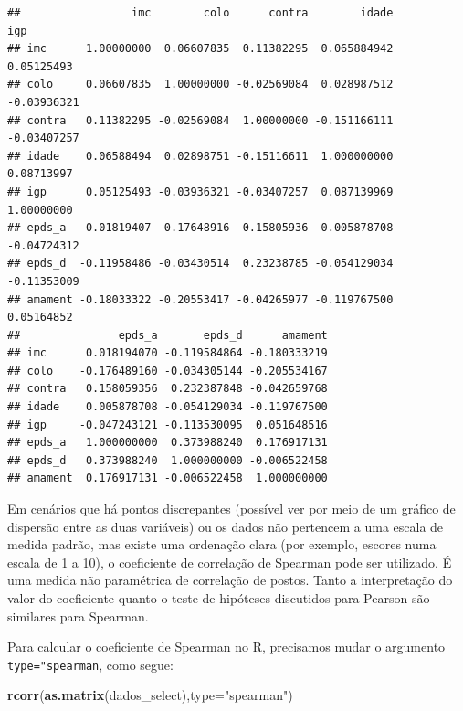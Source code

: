 \documentclass[
]{book}
\newenvironment{Shaded}{\begin{snugshade}}{\end{snugshade}}
\newcommand{\DataTypeTok}[1]{\textcolor[rgb]{0.13,0.29,0.53}{#1}}
\newcommand{\KeywordTok}[1]{\textcolor[rgb]{0.13,0.29,0.53}{\textbf{#1}}}
\newcommand{\NormalTok}[1]{#1}
\newcommand{\StringTok}[1]{\textcolor[rgb]{0.31,0.60,0.02}{#1}}
\begin{document}
\begin{verbatim}
##                 imc        colo      contra        idade         igp
## imc      1.00000000  0.06607835  0.11382295  0.065884942  0.05125493
## colo     0.06607835  1.00000000 -0.02569084  0.028987512 -0.03936321
## contra   0.11382295 -0.02569084  1.00000000 -0.151166111 -0.03407257
## idade    0.06588494  0.02898751 -0.15116611  1.000000000  0.08713997
## igp      0.05125493 -0.03936321 -0.03407257  0.087139969  1.00000000
## epds_a   0.01819407 -0.17648916  0.15805936  0.005878708 -0.04724312
## epds_d  -0.11958486 -0.03430514  0.23238785 -0.054129034 -0.11353009
## amament -0.18033322 -0.20553417 -0.04265977 -0.119767500  0.05164852
##               epds_a       epds_d      amament
## imc      0.018194070 -0.119584864 -0.180333219
## colo    -0.176489160 -0.034305144 -0.205534167
## contra   0.158059356  0.232387848 -0.042659768
## idade    0.005878708 -0.054129034 -0.119767500
## igp     -0.047243121 -0.113530095  0.051648516
## epds_a   1.000000000  0.373988240  0.176917131
## epds_d   0.373988240  1.000000000 -0.006522458
## amament  0.176917131 -0.006522458  1.000000000
\end{verbatim}

Em cenários que há pontos discrepantes (possível ver por meio de um gráfico de dispersão entre as duas variáveis) ou os dados não pertencem a uma escala de medida padrão, mas existe uma ordenação clara (por exemplo, escores numa escala de 1 a 10), o coeficiente de correlação de Spearman pode ser utilizado. É uma medida não paramétrica de correlação de postos. Tanto a interpretação do valor do coeficiente quanto o teste de hipóteses discutidos para Pearson são similares para Spearman.

Para calcular o coeficiente de Spearman no R, precisamos mudar o argumento \texttt{type="spearman}, como segue:

\begin{Shaded}
\begin{Highlighting}[]
\KeywordTok{rcorr}\NormalTok{(}\KeywordTok{as.matrix}\NormalTok{(dados_select),}\DataTypeTok{type=}\StringTok{"spearman"}\NormalTok{)}
\end{Highlighting}
\end{Shaded}
\end{document}
